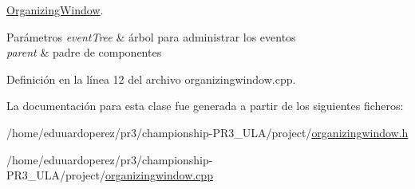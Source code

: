 \hyperlink{class_organizing_window}{Organizing\+Window}. 


\begin{DoxyParams}{Parámetros}
{\em event\+Tree} & árbol para administrar los eventos \\
\hline
{\em parent} & padre de componentes \\
\hline
\end{DoxyParams}


Definición en la línea 12 del archivo organizingwindow.\+cpp.



La documentación para esta clase fue generada a partir de los siguientes ficheros\+:\begin{DoxyCompactItemize}
\item 
/home/eduuardoperez/pr3/championship-\/\+P\+R3\+\_\+\+U\+L\+A/project/\hyperlink{organizingwindow_8h}{organizingwindow.\+h}\item 
/home/eduuardoperez/pr3/championship-\/\+P\+R3\+\_\+\+U\+L\+A/project/\hyperlink{organizingwindow_8cpp}{organizingwindow.\+cpp}\end{DoxyCompactItemize}
